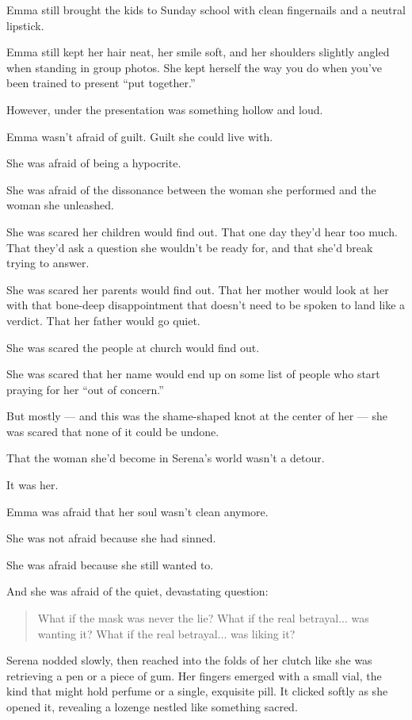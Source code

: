 Emma still brought the kids to Sunday school with clean fingernails and a neutral lipstick.

Emma still kept her hair neat, her smile soft, and her shoulders slightly angled when standing in group 
photos. She kept herself the way you do when you’ve been trained to present ``put together.''

However, under the presentation was something hollow and loud.

Emma wasn’t afraid of guilt. Guilt she could live with.

She was afraid of being a hypocrite.

She was afraid of the dissonance between the woman she performed and the woman she unleashed.

She was scared her children would find out.
That one day they’d hear too much. That they'd ask a question she wouldn't be ready 
for, and that she'd break trying to answer.

She was scared her parents would find out.
That her mother would look at her with that bone-deep disappointment that doesn’t need to be spoken to 
land like a verdict.
That her father would go quiet.

She was scared the people at church would find out.

She was scared that her name would end up on some list of people who start praying for her ``out of concern.''

But mostly --- and this was the shame-shaped knot at the center of her ---
she was scared that none of it could be undone.

That the woman she’d become in Serena’s world wasn’t a detour.

It was her.

Emma was afraid that her soul wasn’t clean anymore. 

She was not afraid because she had sinned. 

She was afraid because she still wanted to.

And she was afraid of the quiet, devastating question:

\begin{quote}
What if the mask was never the lie?
What if the real betrayal... was wanting it?
What if the real betrayal... was liking it?
\end{quote}

Serena nodded slowly, then reached into the folds of her clutch like she was retrieving a pen 
or a piece of gum. Her fingers emerged with a small vial, the kind that might hold perfume or a single, 
exquisite pill. It clicked softly as she opened it, revealing a lozenge nestled like something sacred.

